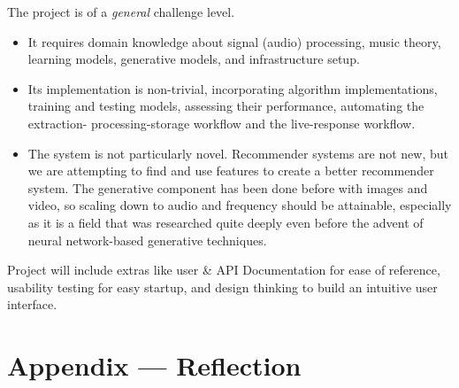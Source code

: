 \documentclass{article}
\begin{document}
The project is of a \emph{general} challenge level.
\begin{itemize}
    \item It requires domain knowledge about signal (audio) processing, music
    theory, learning models, generative models, and infrastructure setup.
    \item Its implementation is non-trivial, incorporating algorithm implementations, 
    training and testing models, assessing their performance, automating the extraction-
    processing-storage workflow and the live-response workflow.
    \item The system is not particularly novel. Recommender systems are not new, but we are 
    attempting to find and use features to create a better recommender system. The generative 
    component has been done before with images and video, so scaling down to audio and frequency 
    should be attainable, especially as it is a field that was researched quite deeply even before 
    the advent of neural network-based generative techniques.
\end{itemize}

\noindent
Project will include extras like user \& API Documentation for ease of reference, usability testing 
for easy startup, and design thinking to build an intuitive user interface.

\newpage{}

\section*{Appendix --- Reflection}



\end{document}
